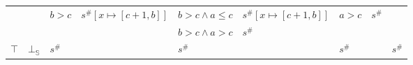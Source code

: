 \documentclass[aspectratio=169]{beamer}
\begin{document}
\begin{frame}
\begin{table}[]
{\begin{tabular}{|l|l|ll|ll|ll|l|}
                                        &                         & \multirow{2}{*}{$b > c$} & \multirow{2}{*}{$s^\#[x \mapsto [c + 1, b]]$} & $b > c \land a \le c$ & $s^\#[x \mapsto [c + 1, b]]$ & \multirow{2}{*}{$a > c$} & \multirow{2}{*}{$s^\#$}        &                                                 \\
                                        &                         &                          &                                               & $b > c \land a > c$   & $s^\#$                   &                          &                                &                                                 \\ \hline
        $\top$                          & $\bot_\mathbb{S}$                  & \multicolumn{2}{l|}{$s^\#$}                                              & \multicolumn{2}{l|}{$s^\#$}                      & \multicolumn{2}{l|}{$s^\#$}                               & $s^\#$                                          \\ \hline
        \end{tabular}}
        \end{table}
    \end{frame}
    
\end{document}
